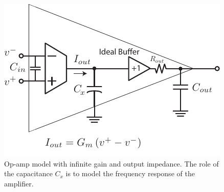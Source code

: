 \begin{figure}[t]
\centering
\includegraphics[scale=1.35]{opamp_ota_model_cap}
\caption{Op-amp model with infinite gain and output impedance.  The role of the capacitance $C_x$ is to model the frequency response of the amplifier.}
\label{fig:opamp_ota_model_cap}
\end{figure}
